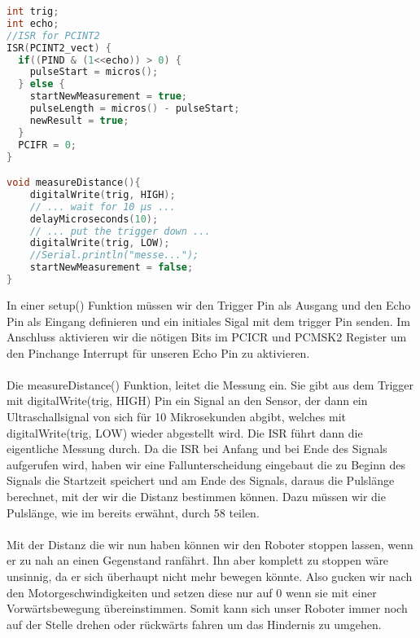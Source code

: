 \documentclass[12pt]{article}
\begin{document}
\begin{file}[HC-SR04]
		
        \begin{lstlisting}[language=C++, inputencoding={utf8}, extendedchars=false]   
int trig;
int echo;
//ISR for PCINT2
ISR(PCINT2_vect) {
  if((PIND & (1<<echo)) > 0) {
    pulseStart = micros();
  } else {
    startNewMeasurement = true;
    pulseLength = micros() - pulseStart;
    newResult = true;
  }
  PCIFR = 0;
}

void measureDistance(){   
    digitalWrite(trig, HIGH);
    // ... wait for 10 µs ...
    delayMicroseconds(10);
    // ... put the trigger down ...    
    digitalWrite(trig, LOW);     
    //Serial.println("messe...");
    startNewMeasurement = false;    
}
        \end{lstlisting}
        
\end{file}
In einer setup() Funktion müssen wir den Trigger Pin als Ausgang und den Echo Pin als Eingang definieren und ein initiales Sigal mit dem trigger Pin senden. Im Anschluss aktivieren wir die nötigen Bits im PCICR und PCMSK2 Register um den Pinchange Interrupt für unseren Echo Pin zu aktivieren.\\
\\
Die measureDistance() Funktion, leitet die Messung ein. Sie gibt aus dem Trigger mit digitalWrite(trig, HIGH) Pin ein Signal an den Sensor, der dann ein Ultraschallsignal von sich für 10 Mikrosekunden abgibt, welches mit digitalWrite(trig, LOW) wieder abgestellt wird. Die ISR führt dann die eigentliche Messung durch. Da die ISR bei Anfang und bei Ende des Signals aufgerufen wird, haben wir eine Fallunterscheidung eingebaut die zu Beginn des Signals die Startzeit speichert und am Ende des Signals, daraus die Pulslänge berechnet, mit der wir die Distanz bestimmen können. Dazu müssen wir die Pulslänge, wie im bereits erwähnt, durch 58 teilen.\\
\\
Mit der Distanz die wir nun haben können wir den Roboter stoppen lassen, wenn er zu nah an einen Gegenstand ranfährt. Ihn aber komplett zu stoppen wäre unsinnig, da er sich überhaupt nicht mehr bewegen könnte. Also gucken wir nach den Motorgeschwindigkeiten und setzen diese nur auf 0 wenn sie mit einer Vorwärtsbewegung übereinstimmen. Somit kann sich unser Roboter immer noch auf der Stelle drehen oder rückwärts fahren um das Hindernis zu umgehen. 

\newpage
\end{document}
